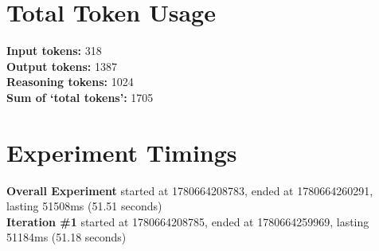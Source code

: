 \documentclass{article}
\begin{document}
\section*{Total Token Usage}
\textbf{Input tokens: }318
\\\textbf{Output tokens: }1387
\\\textbf{Reasoning tokens: }1024
\\\textbf{Sum of `total tokens': }1705
\section*{Experiment Timings}
\textbf{Overall Experiment} started at 1780664208783, ended at 1780664260291, lasting 51508ms (51.51 seconds)
\\\textbf{Iteration \#1} started at 1780664208785, ended at 1780664259969, lasting 51184ms (51.18 seconds)
\end{document}
